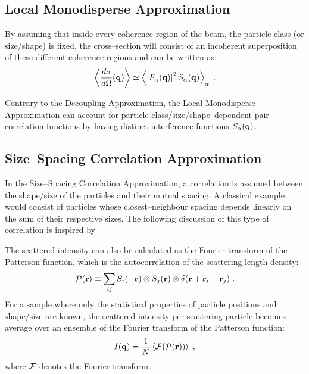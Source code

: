 \subsection{Local Monodisperse Approximation}
By assuming that inside every coherence region of the beam, the particle class (or size/shape) is fixed, the cross--section will consist of an incoherent superposition of these different coherence regions and can be written as:
\begin{equation*}
  \left\langle \frac{d\sigma}{d\Omega}(\mathbf{q}) \right\rangle \simeq \left\langle \left\lvert F_\alpha(\mathbf{q})\right\rvert ^2 S_\alpha(\mathbf{q}) \right\rangle_\alpha \; .
\end{equation*}

Contrary to the Decoupling Approximation, the Local Monodisperse Approximation can account for particle class/size/shape--dependent pair correlation functions by having distinct interference functions $S_\alpha(\mathbf{q})$.

\subsection{Size--Spacing Correlation Approximation}
In the Size--Spacing Correlation Approximation, a correlation is assumed between the shape/size of the particles and their mutual spacing. A classical example would consist of particles whose closest--neighbour spacing depends linearly on the sum of their respective sizes. The following discussion of this type of correlation is inspired by \cite{LaLR07}

The scattered intensity can also be calculated as the Fourier transform of the Patterson function, which is the autocorrelation of the scattering length density:
\begin{equation*}
  \mathcal{P} (\mathbf{r} ) \equiv \sum_{ij} S_i(-\mathbf{r} )\otimes S_j(\mathbf{r} )\otimes \delta (\mathbf{r} + \mathbf{r}_i - \mathbf{r}_j ) \; .
\end{equation*}
For a sample where only the statistical properties of particle positions and shape/size are known, the scattered intensity per scattering particle becomes average over an ensemble of the Fourier transform of the Patterson function:
\begin{equation*}
  I(\mathbf{q} ) = \frac{1}{N}\left\langle \mathcal{F} (\mathcal{P} (\mathbf{r} )) \right\rangle_{}  \; ,
\end{equation*}
where $\mathcal{F}$ denotes the Fourier transform.

